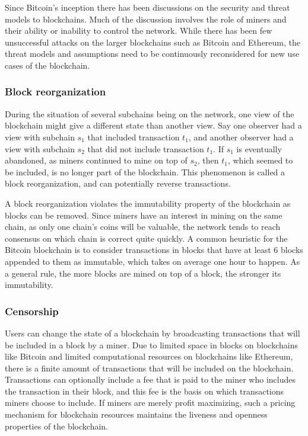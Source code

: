 Since Bitcoin's inception there has been discussions on the security and threat models to blockchains. Much of the discussion involves the role of miners and their ability or inability to control the network. While there has been few unsuccessful attacks on the larger blockchains such as Bitcoin and Ethereum, the threat models and assumptions need to be continuously reconsidered for new use cases of the blockchain.

\subsubsection{Block reorganization}
During the situation of several subchains being on the network, one view of the blockchain might give a different state than another view. Say one observer had a view with subchain $s_1$ that included transaction $t_1$, and another observer had a view with subchain $s_2$ that did not include transaction $t_1$. If $s_1$ is eventually abandoned, as miners continued to mine on top of $s_2$, then $t_1$, which seemed to be included, is no longer part of the blockchain. This phenomenon is called a block reorganization, and can potentially reverse transactions.

A block reorganization violates the immutability property of the blockchain as blocks can be removed. Since miners have an interest in mining on the same chain, as only one chain's coins will be valuable, the network tends to reach consensus on which chain is correct quite quickly. A common heuristic for the Bitcoin blockchain is to consider transactions in blocks that have at least 6 blocks appended to them as immutable, which takes on average one hour to happen. As a general rule, the more blocks are mined on top of a block, the stronger its immutability. 


\subsubsection{Censorship}
Users can change the state of a blockchain by broadcasting transactions that will be included in a block by a miner. Due to limited space in blocks on blockchains like Bitcoin and limited computational resources on blockchains like Ethereum, there is a finite amount of transactions that will be included on the blockchain. Transactions can optionally include a fee that is paid to the miner who includes the transaction in their block, and this fee is the basis on which transactions miners choose to include. If miners are merely profit maximizing, such a pricing mechanism for blockchain resources maintains the liveness and openness properties of the blockchain.

